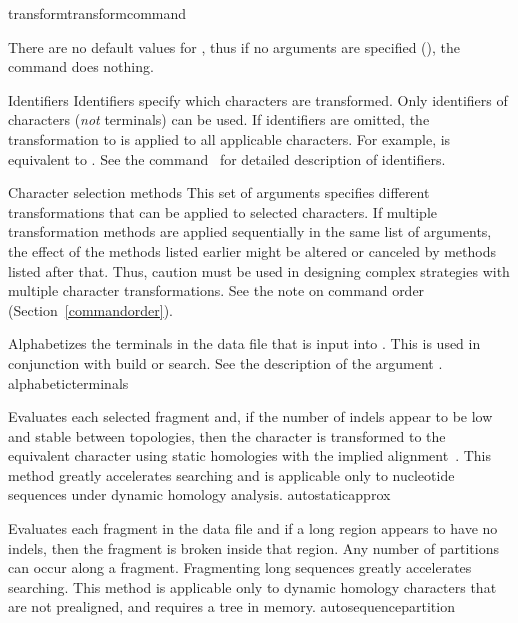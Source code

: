 \begin{command}{transform}{transformcommand}
\begin{poydescription}
There are no default values for , thus if
no arguments are specified (), the command does nothing.
\end{poydescription}

\begin{arguments}

\begin{argumentgroup}{Identifiers}
Identifiers specify which characters are transformed. Only
identifiers of characters (\emph{not} terminals) can be used. If
identifiers are omitted, the transformation to is applied to all
applicable characters. For example,
 is equivalent to
. See the command~
for detailed description of identifiers.
\end{argumentgroup}

\begin{argumentgroup}{Character selection methods}
This set of arguments specifies different transformations that can be applied
to selected characters. If multiple transformation methods are applied
sequentially in the same list of arguments, the effect of the methods listed
earlier might be altered or canceled by methods listed after that. Thus, caution
must be used in designing complex strategies with multiple character
transformations. See the note on command order (Section~\ref{commandorder}).

{Alphabetizes the terminals in the data file that is input into \poy. This is used in 
conjunction with build or search. See the description of the argument 
.}
{alphabeticterminals}

{Evaluates each selected fragment and, if the number of indels
appear to be low and stable between topologies, then the character
is transformed to the equivalent character using static homologies
with the implied alignment~\cite{wheeler2003}.
This method greatly accelerates searching and is applicable only to 
nucleotide sequences under dynamic homology analysis.}
{autostaticapprox}

{Evaluates each fragment in the data file and if a long region appears 
to have no indels, then the fragment is broken inside that region.
Any number of partitions can occur along a fragment. Fragmenting
long sequences greatly accelerates searching. This method is
applicable only to dynamic homology characters that are not prealigned, 
and requires a tree in memory.}
{autosequencepartition}


\end{argumentgroup}
\end{arguments}
\end{command}
